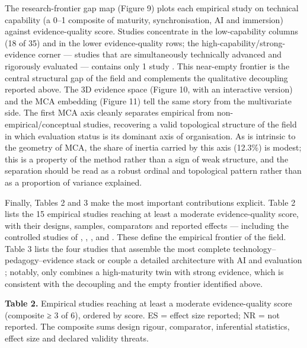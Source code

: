 The research-frontier gap map (Figure 9) plots each
empirical study on technical capability (a 0--1 composite of maturity,
synchronisation, AI and immersion) against evidence-quality score. Studies
concentrate in the low-capability columns (18 of 35) and in the lower
evidence-quality rows; the high-capability/strong-evidence corner --- studies that
are simultaneously technically advanced and rigorously evaluated --- contains only
1 study \citep{tarng_application_2024}. This near-empty frontier is the central structural gap of the field
and complements the qualitative decoupling reported above. The 3D evidence space
(Figure 10, with an interactive version) and the MCA embedding (Figure 11) tell
the same story from the multivariate side. The first MCA axis cleanly separates
empirical from non-empirical/conceptual studies, recovering a valid topological
structure of the field in which evaluation status is its dominant axis of
organisation. As is intrinsic to the geometry of MCA, the share of inertia carried
by this axis (12.3\%) is modest; this is a property of the method rather than a sign
of weak structure, and the separation should be read as a robust ordinal and
topological pattern rather than as a proportion of variance explained.

Finally, Tables 2 and 3 make the most important contributions explicit.
Table 2 lists the 15 empirical studies reaching at least a moderate
evidence-quality score, with their designs, samples, comparators and reported
effects --- including the controlled studies of \citet[between-group
gain +18.5 vs +4.3, t(198)=8.94]{kwateng_enhancing_2026}, \citet[ANCOVA F=71.9, p\textless0.001,
η²=0.50]{tarng_application_2024}, \citet[+31.2\% transfer to novel problems with retention at
3 and 6 months]{lin_visfactory_2025}, \citet[d=1.06 in algorithm design]{lu_digital_2025} and
\citet[+16.6\% vs +7.5\% knowledge mastery]{wang_innovative_2025}. These define the empirical frontier of
the field. Table 3 lists the four studies that assemble the most complete
technology--pedagogy--evidence stack \citep{sakkas_multiplayer_2025, tarng_application_2024, terkaj_framework_2024} or couple a detailed architecture with AI and evaluation
\citep{machado_automatic_2025}; notably, only \citet{tarng_application_2024} combines a high-maturity
twin with strong evidence, which is consistent with the decoupling and the empty
frontier identified above.

\textbf{Table 2.} Empirical studies reaching at least a moderate evidence-quality
score (composite ≥ 3 of 6), ordered by score. ES = effect size reported;
NR = not reported. The composite sums design rigour, comparator, inferential
statistics, effect size and declared validity threats.


